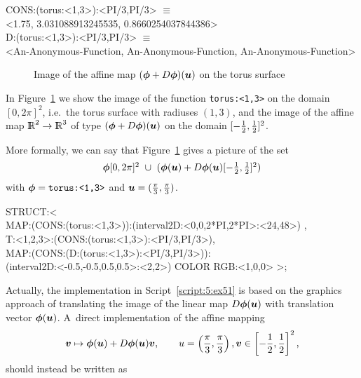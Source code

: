 \documentclass{31x47jw}
\begin{document}
\begin{example}
\begin{smallplasm}
CONS:(torus:<1,3>):<PI/3,PI/3> $\equiv$ \+\\
<1.75, 3.031088913245535, 0.8660254037844386>\-\\[0.3cm]

D:(torus:<1,3>):<PI/3,PI/3>  $\equiv$ \+\\ 
<An-Anonymous-Function, An-Anonymous-Function, 
    An-Anonymous-Function> 
\end{smallplasm} 

\begin{figure}[htb]
\centering
{}
\caption{Image of the affine map $({\mbox{\boldmath $\phi$}}+D{\mbox{\boldmath $\phi$}})({\mbox{\boldmath $u$}})$
on the torus surface
\label{figure:5:ex51}}
\end{figure}

In Figure~\ref{figure:5:ex51} we show the image of the function
\texttt{torus:<1,3>} on the domain $[0,2\pi]^{2}$, i.e.~the torus
surface with radiuses $(1,3)$, and the image of the affine map
$\mathbb{I\!\!R}^{2}\rightarrow\mathbb{I\!\!R}^{3}$ of type $({\mbox{\boldmath $\phi$}}+D{\mbox{\boldmath $\phi$}})({\mbox{\boldmath $u$}})$ on the 
domain $[-{1\over 2},{1\over 2}]^{2}$.

More formally, we can say that Figure~\ref{figure:5:ex51} gives a
picture of the set 
\[
\textstyle{ {\mbox{\boldmath $\phi$}}[0,2\pi]^{2} \ \cup\
({\mbox{\boldmath $\phi$}}({\mbox{\boldmath $u$}})+D{\mbox{\boldmath $\phi$}}({\mbox{\boldmath $u$}})[-{1\over 2},{1\over 2}]^{2} )}
\]
with ${\mbox{\boldmath $\phi$}} = \texttt{torus:<1,3>}$ and
${\mbox{\boldmath $u$}}=({\pi\over3},{\pi\over3})$.

\begin{script}
\begin{smallplasm} 
STRUCT:<\+\\
  MAP:(CONS:(torus:<1,3>)):(interval2D:<0,0,2*PI,2*PI>:<24,48>) ,\\
  
  T:<1,2,3>:(CONS:(torus:<1,3>):<PI/3,PI/3>),\\
  
  MAP:(CONS:(D:(torus:<1,3>):<PI/3,PI/3>)):\+\\
    (interval2D:<-0.5,-0.5,0.5,0.5>:<2,2>) COLOR RGB:<1,0,0>  >;
\end{smallplasm} 
\label{script:5:ex51}
\end{script}
    
Actually, the implementation in Script~\ref{script:5:ex51} is based on 
the graphics approach of translating the image of the linear map 
$D{\mbox{\boldmath $\phi$}}({\mbox{\boldmath $u$}})$ with translation vector ${\mbox{\boldmath $\phi$}}({\mbox{\boldmath $u$}})$.
A~direct implementation of the affine mapping
\[
{\mbox{\boldmath $v$}} \mapsto {\mbox{\boldmath $\phi$}}({\mbox{\boldmath $u$}})+D{\mbox{\boldmath $\phi$}}({\mbox{\boldmath $u$}}) {\mbox{\boldmath $v$}}, 
\qquad u = \left({\pi\over 3}, {\pi\over 3}\right), 
{\mbox{\boldmath $v$}}\in \left[-{1\over 2},{1\over 2}\right]^{2} , 
\]
should instead be written as



\end{example}
\end{document}

